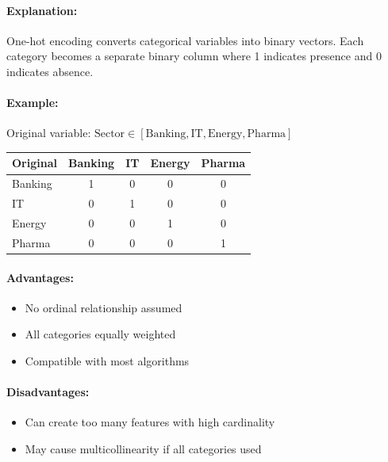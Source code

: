 \documentclass[11pt,a4paper]{article}
\begin{document}
\paragraph{Explanation:}
One-hot encoding converts categorical variables into binary vectors. Each category becomes a separate binary column where 1 indicates presence and 0 indicates absence.

\paragraph{Example:}
Original variable: $\text{Sector} \in [\text{Banking}, \text{IT}, \text{Energy}, \text{Pharma}]$

\begin{center}
\begin{tabular}{lcccc}
\toprule
\textbf{Original} & \textbf{Banking} & \textbf{IT} & \textbf{Energy} & \textbf{Pharma} \\
\midrule
Banking & 1 & 0 & 0 & 0 \\
IT & 0 & 1 & 0 & 0 \\
Energy & 0 & 0 & 1 & 0 \\
Pharma & 0 & 0 & 0 & 1 \\
\bottomrule
\end{tabular}
\end{center}

\paragraph{Advantages:}
\begin{itemize}
    \item No ordinal relationship assumed
    \item All categories equally weighted
    \item Compatible with most algorithms
\end{itemize}

\paragraph{Disadvantages:}
\begin{itemize}
    \item Can create too many features with high cardinality
    \item May cause multicollinearity if all categories used
\end{itemize}

\vspace{0.35cm}
\end{document}
